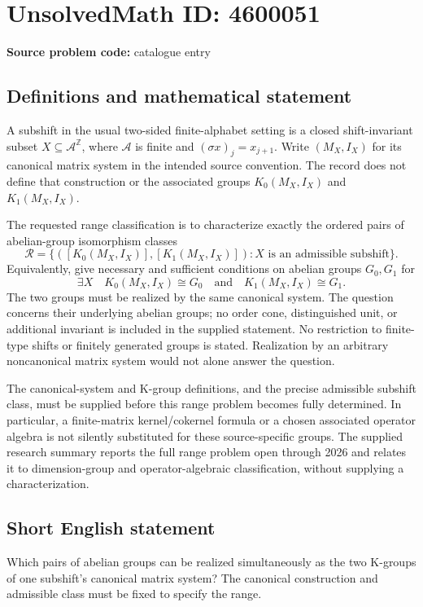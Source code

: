 \documentclass[11pt]{article}
\newcommand{\Z}{\mathbb{Z}}
\begin{document}
\section*{UnsolvedMath ID: 4600051}
\textbf{Source problem code:} catalogue entry
\subsection{Definitions and mathematical statement}
A subshift in the usual two-sided finite-alphabet setting is a closed shift-invariant subset \(X\subseteq\mathcal A^{\Z}\), where \(\mathcal A\) is finite and \((\sigma x)_j=x_{j+1}\). Write \((M_X,I_X)\) for its canonical matrix system in the intended source convention. The record does not define that construction or the associated groups \(K_0(M_X,I_X)\) and \(K_1(M_X,I_X)\).

The requested range classification is to characterize exactly the ordered pairs of abelian-group isomorphism classes
\[
\mathcal R=\{([K_0(M_X,I_X)],[K_1(M_X,I_X)]):
 X\text{ is an admissible subshift}\}.
\]
Equivalently, give necessary and sufficient conditions on abelian groups \(G_0,G_1\) for
\[
\exists X\quad K_0(M_X,I_X)\cong G_0
\quad\text{and}\quad K_1(M_X,I_X)\cong G_1.
\]
The two groups must be realized by the same canonical system. The question concerns their underlying abelian groups; no order cone, distinguished unit, or additional invariant is included in the supplied statement. No restriction to finite-type shifts or finitely generated groups is stated. Realization by an arbitrary noncanonical matrix system would not alone answer the question.

The canonical-system and K-group definitions, and the precise admissible subshift class, must be supplied before this range problem becomes fully determined. In particular, a finite-matrix kernel/cokernel formula or a chosen associated operator algebra is not silently substituted for these source-specific groups. The supplied research summary reports the full range problem open through 2026 and relates it to dimension-group and operator-algebraic classification, without supplying a characterization.
\subsection{Short English statement}
Which pairs of abelian groups can be realized simultaneously as the two K-groups of one subshift's canonical matrix system? The canonical construction and admissible class must be fixed to specify the range.
\end{document}
